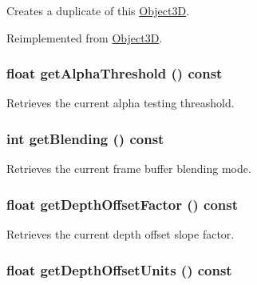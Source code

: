Creates a duplicate of this \hyperlink{classm3g_1_1Object3D}{Object3D}. 

Reimplemented from \hyperlink{classm3g_1_1Object3D_a25110dac934f867b83b73ad4741a0f4}{Object3D}.\hypertarget{classm3g_1_1CompositingMode_19ab71363ea77fa86aa6fafce87f06cb}{
\subsubsection[{getAlphaThreshold}]{\setlength{\rightskip}{0pt plus 5cm}float getAlphaThreshold () const}}
\label{classm3g_1_1CompositingMode_19ab71363ea77fa86aa6fafce87f06cb}


Retrieves the current alpha testing threashold. \hypertarget{classm3g_1_1CompositingMode_078954de3d786bd11dc98b06f237bbbb}{
\subsubsection[{getBlending}]{\setlength{\rightskip}{0pt plus 5cm}int getBlending () const}}
\label{classm3g_1_1CompositingMode_078954de3d786bd11dc98b06f237bbbb}


Retrieves the current frame buffer blending mode. \hypertarget{classm3g_1_1CompositingMode_d24a4116e72678164f31d7a48f74be6b}{
\subsubsection[{getDepthOffsetFactor}]{\setlength{\rightskip}{0pt plus 5cm}float getDepthOffsetFactor () const}}
\label{classm3g_1_1CompositingMode_d24a4116e72678164f31d7a48f74be6b}


Retrieves the current depth offset slope factor. \hypertarget{classm3g_1_1CompositingMode_add4c6c3bc01c1d0689e0588af79039f}{
\subsubsection[{getDepthOffsetUnits}]{\setlength{\rightskip}{0pt plus 5cm}float getDepthOffsetUnits () const}}
\label{classm3g_1_1CompositingMode_add4c6c3bc01c1d0689e0588af79039f}


